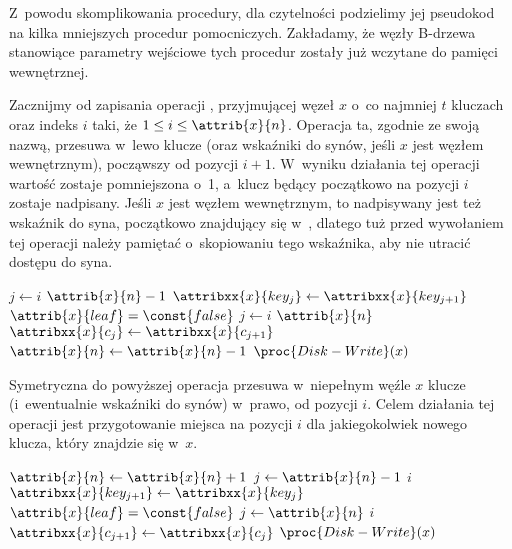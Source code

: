 
\exercise %
\exercise %
Z~powodu skomplikowania procedury, dla czytelności podzielimy jej pseudokod na kilka mniejszych procedur pomocniczych.
Zakładamy, że węzły B-drzewa stanowiące parametry wejściowe tych procedur zostały już wczytane do pamięci wewnętrznej.

Zacznijmy od zapisania operacji , przyjmującej węzeł $x$ o~co najmniej $t$ kluczach oraz indeks $i$ taki, że $1\le i\le\attrib{x}{n}$.
Operacja ta, zgodnie ze swoją nazwą, przesuwa w~lewo klucze (oraz wskaźniki do synów, jeśli $x$ jest węzłem wewnętrznym), począwszy od pozycji $i+1$.
W~wyniku działania tej operacji wartość  zostaje pomniejszona o~1, a~klucz będący początkowo na pozycji $i$ zostaje nadpisany.
Jeśli $x$ jest węzłem wewnętrznym, to nadpisywany jest też wskaźnik do syna, początkowo znajdujący się w~, dlatego tuż przed wywołaniem tej operacji należy pamiętać o~skopiowaniu tego wskaźnika, aby nie utracić dostępu do syna.
\begin{codebox}
    \li \For $j\gets i$ \To $\attrib{x}{n}-1$
    \li     \Do $\attribxx{x}{key_j}\gets\attribxx{x}{key_{j+1}}$
            \End
    \li \If $\attrib{x}{leaf}=\const{false}$
    \li     \Then \For $j\gets i$ \To $\attrib{x}{n}$
    \li         \Do $\attribxx{x}{c_j}\gets\attribxx{x}{c_{j+1}}$
                \End
            \End
    \li $\attrib{x}{n}\gets\attrib{x}{n}-1$
    \li $\proc{Disk-Write}(x)$
\end{codebox}
Symetryczna do powyższej operacja  przesuwa w~niepełnym węźle $x$ klucze (i~ewentualnie wskaźniki do synów) w~prawo, od pozycji $i$.
Celem działania tej operacji jest przygotowanie miejsca na pozycji $i$ dla jakiegokolwiek nowego klucza, który znajdzie się w~$x$.
\begin{codebox}
    \li $\attrib{x}{n}\gets\attrib{x}{n}+1$
    \li \For $j\gets\attrib{x}{n}-1$ \Downto $i$
    \li     \Do $\attribxx{x}{key_{j+1}}\gets\attribxx{x}{key_j}$
            \End
    \li \If $\attrib{x}{leaf}=\const{false}$
    \li     \Then \For $j\gets\attrib{x}{n}$ \Downto $i$
    \li         \Do $\attribxx{x}{c_{j+1}}\gets\attribxx{x}{c_j}$
                \End
            \End
    \li $\proc{Disk-Write}(x)$
\end{codebox}

